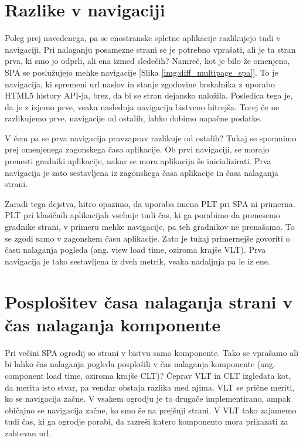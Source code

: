 \documentclass[a4paper, 12pt]{book}
\begin{document}
\FloatBarrier

\section{Razlike v navigaciji}

Poleg prej navedenega, pa se enostranske spletne aplikacije razlikujejo tudi v navigaciji. Pri nalaganju posamezne strani se je potrebno vprašati, ali je ta stran prva, ki smo jo odprli, ali ena izmed sledečih? Namreč, kot je bilo že omenjeno, SPA se poslužujejo mehke navigacije [Slika \ref{img:diff_multipage_spa}]. To je navigacija, ki spremeni url naslov in stanje zgodovine brskalnika z uporabo HTML5 history API-ja, brez, da bi se stran dejansko naložila. Posledica tega je, da je z izjemo prve, vsaka naslednja navigacija bistveno hitrejša. Torej če ne razlikujemo prve,  navigacije od ostalih, lahko  dobimo napačne podatke.

V čem pa se prva navigacija pravzaprav razlikuje od ostalih? Tukaj se spomnimo prej omenjenega zagonskega časa aplikacije. Ob prvi navigaciji, se morajo prenesti gradniki aplikacije, nakar se mora aplikacija še inicializirati. Prva navigacija je zato sestavljena iz zagonskega časa aplikacije in časa nalaganja strani.

Zaradi tega dejstva, hitro opazimo, da uporaba imena PLT pri SPA ni primerna. PLT pri klasičnih aplikacijah vsebuje tudi čas, ki ga porabimo da prenesemo gradnike strani, v primeru mehke navigacije, pa teh gradnikov ne prenašamo. To se zgodi samo v zagonskem času aplikacije. Zato je tukaj primernejše govoriti o času nalaganja pogleda (ang. view load time, oziroma krajše VLT). Prva navigacija je tako sestavljena iz dveh metrik, vsaka nadaljnja pa le iz ene.

\section{Posplošitev časa nalaganja strani v čas nalaganja komponente}

Pri večini SPA ogrodij so strani v bistvu samo komponente. Tako se vprašamo ali bi lahko čas nalaganja pogleda posplošili v čas nalaganja komponente (ang. component load time, oziroma krajše CLT)? Čeprav VLT in CLT izgledata kot, da merita isto stvar, pa vendar obstaja razlika med njima. VLT se prične meriti, ko se navigacija začne. V vsakem ogrodju je to drugače implementirano, ampak običajno se navigacija začne, ko smo še na prejšnji strani. V VLT tako zajamemo tudi čas, ki ga ogrodje porabi, da razreši katero komponento mora prikazati za zahtevan url.
\end{document}
